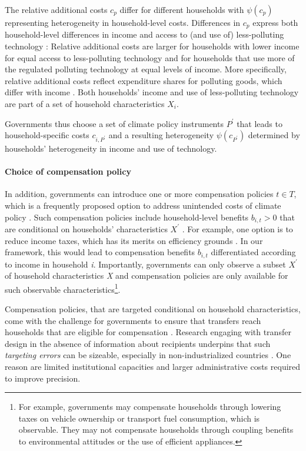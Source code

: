 \documentclass[12pt, a4paper]{article}
\begin{document}
The relative additional costs $c_{p}$ differ for different households with $\psi(c_{p})$ representing heterogeneity in household-level costs. Differences in $c_{p}$ express both household-level differences in income and access to (and use of) less-polluting technology \autocite{Hansel.2022}: Relative additional costs are larger for households with lower income for equal access to less-polluting technology and for households that use more of the regulated polluting technology at equal levels of income. More specifically, relative additional costs reflect expenditure shares for polluting goods, which differ with income \autocite{Jacobs.2019,Dorband.2019}. Both households' income and use of less-polluting technology are part of a set of household characteristics $X_{i}$. 

Governments thus choose a set of climate policy instruments $P^{\prime}$ that leads to household-specific costs $c_{i,P^{\prime}}$ and a resulting heterogeneity $\psi(c_{P^{\prime}})$ determined by households' heterogeneity in income and use of technology.

\paragraph{Choice of compensation policy}
In addition, governments can introduce one or more compensation policies $t \in T$, which is a frequently proposed option to address unintended costs of climate policy \autocite{Klenert.2018,Baranzini.2017}. Such compensation policies include household-level benefits $b_{i,t}>0$ that are conditional on households' characteristics $X^{\prime}$ \autocite[e.g.,][]{Akerlof.1978}. For example, one option is to reduce income taxes, which has its merits on efficiency grounds \autocite{Pearce.1991,Goulder.1995,Bento.2018}. In our framework, this would lead to compensation benefits $b_{i,t}$ differentiated according to income in household \textit{i}. Importantly, governments can only observe a subset $X^{\prime}$ of household characteristics \textit{X} and compensation policies are only available for such observable characteristics\footnote{For example, governments may compensate households through lowering taxes on vehicle ownership or transport fuel consumption, which is observable. They may not compensate households through coupling benefits to environmental attitudes or the use of efficient appliances.}. 

Compensation policies, that are targeted conditional on household characteristics, come with the challenge for governments to ensure that transfers reach households that are eligible for compensation \autocite[e.g.,][]{Hanna.2018}. Research engaging with transfer design in the absence of information about recipients underpins that such \textit{targeting errors} can be sizeable, especially in non-industrialized countries \autocite{WorldBank.2018, Robles.2019}. One reason are limited institutional capacities \autocite[e.g.,][]{Besley.2009} and larger administrative costs \autocite{Coady.2004} required to improve precision.
\end{document}
